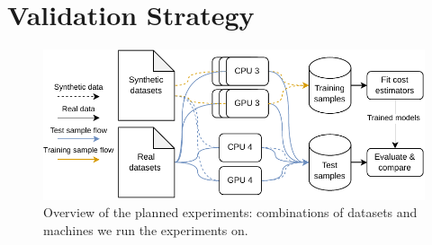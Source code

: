 \section{Validation Strategy}

\begin{figure}[ht]
    \centering
    \includegraphics[width=0.8\linewidth]{chapters/05_experiment_setup/figures/experiment-pipeline.pdf}
    \caption{ Overview of the planned experiments: combinations of datasets and machines we run the experiments
        on. }
    \label{fig:enter-label}
\end{figure}

